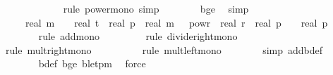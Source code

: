 \begin{isabellebody}
\ \ \ \ \ \ \ \ \ \ \ \isamarkupfalse%
\ {\isacharparenleft}{\kern0pt}rule\ power{\isacharunderscore}{\kern0pt}mono{\isacharcomma}{\kern0pt}\ simp{\isacharparenright}{\kern0pt}\isanewline
\ \ \ \ \ \ \isamarkupfalse%
\ b{\isacharunderscore}{\kern0pt}ge{\isacharunderscore}{\kern0pt}{}\ \isamarkupfalse%
\ simp{\isacharplus}{\kern0pt}\isanewline
\ \ \ \ \isamarkupfalse%
\ \isamarkupfalse%
\ {\isachardoublequoteopen}{\isachardot}{\kern0pt}{\isachardot}{\kern0pt}{\isachardot}{\kern0pt}\ {\isasymle}\ {}\ {\isacharasterisk}{\kern0pt}\ {\isacharparenleft}{\kern0pt}real\ m{\isacharparenright}{\kern0pt}\ {\isacharasterisk}{\kern0pt}\ {\isacharparenleft}{\kern0pt}{}\ {\isacharasterisk}{\kern0pt}\ real\ t\ {\isacharasterisk}{\kern0pt}\ real\ p\ {\isacharslash}{\kern0pt}\ real\ m{\isacharparenright}{\kern0pt}\ {\isacharasterisk}{\kern0pt}\ {\isacharparenleft}{\kern0pt}{}\ powr\ {\isacharminus}{\kern0pt}\ real\ r{\isacharparenright}{\kern0pt}\ {\isacharslash}{\kern0pt}\ {\isacharparenleft}{\kern0pt}real\ p{\isacharparenright}{\kern0pt}\ {\isacharplus}{\kern0pt}\ {}\ {\isacharslash}{\kern0pt}\ real\ p{\isachardoublequoteclose}\isanewline
\ \ \ \ \ \ \isamarkupfalse%
\ {\isacharparenleft}{\kern0pt}rule\ add{\isacharunderscore}{\kern0pt}mono{\isacharparenright}{\kern0pt}\isanewline
\ \ \ \ \ \ \ \isamarkupfalse%
\ {\isacharparenleft}{\kern0pt}rule\ divide{\isacharunderscore}{\kern0pt}right{\isacharunderscore}{\kern0pt}mono{\isacharparenright}{\kern0pt}\isanewline
\ \ \ \ \ \ \ \ \isamarkupfalse%
\ {\isacharparenleft}{\kern0pt}rule\ mult{\isacharunderscore}{\kern0pt}right{\isacharunderscore}{\kern0pt}mono{\isacharparenright}{\kern0pt}\isanewline
\ \ \ \ \ \ \ \ \isamarkupfalse%
\ {\isacharparenleft}{\kern0pt}rule\ mult{\isacharunderscore}{\kern0pt}left{\isacharunderscore}{\kern0pt}mono{\isacharparenright}{\kern0pt}\isanewline
\ \ \ \ \ \ \isamarkupfalse%
\ {\isacharparenleft}{\kern0pt}simp\ add{\isacharcolon}{\kern0pt}b{\isacharunderscore}{\kern0pt}def{\isacharparenright}{\kern0pt}\ \isanewline
\ \ \ \ \ \ \isamarkupfalse%
\ b{\isacharunderscore}{\kern0pt}def\ b{\isacharunderscore}{\kern0pt}ge{\isacharunderscore}{\kern0pt}{}\ b{\isacharunderscore}{\kern0pt}le{\isacharunderscore}{\kern0pt}tpm\ \isamarkupfalse%
\ force\isanewline

\end{isabellebody}
